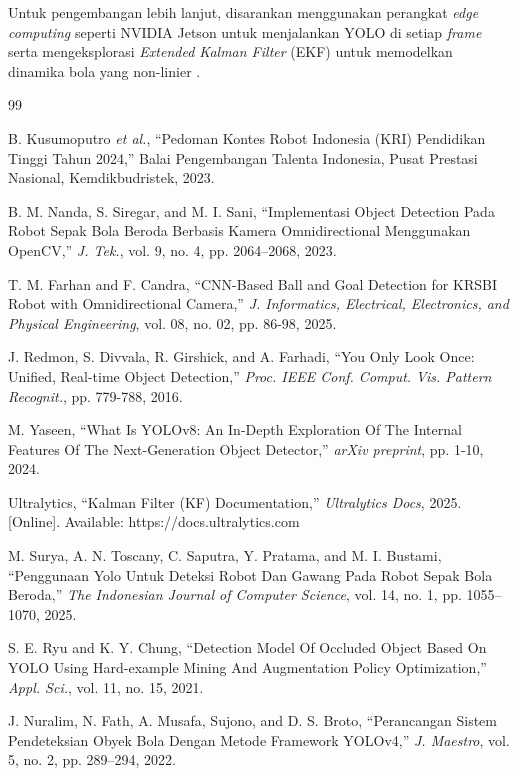 \documentclass[12pt,a4paper]{article}
\begin{document}
Untuk pengembangan lebih lanjut, disarankan menggunakan perangkat \textit{edge computing} seperti NVIDIA Jetson untuk menjalankan YOLO di setiap \textit{frame} serta mengeksplorasi \textit{Extended Kalman Filter} (EKF) untuk memodelkan dinamika bola yang non-linier \cite{Firdaus2025}.

\begin{thebibliography}{99}

 B. Kusumoputro \textit{et al.}, ``Pedoman Kontes Robot Indonesia (KRI) Pendidikan Tinggi Tahun 2024,'' Balai Pengembangan Talenta Indonesia, Pusat Prestasi Nasional, Kemdikbudristek, 2023.

 B. M. Nanda, S. Siregar, and M. I. Sani, ``Implementasi Object Detection Pada Robot Sepak Bola Beroda Berbasis Kamera Omnidirectional Menggunakan OpenCV,'' \textit{J. Tek.}, vol. 9, no. 4, pp. 2064–2068, 2023.

 T. M. Farhan and F. Candra, ``CNN-Based Ball and Goal Detection for KRSBI Robot with Omnidirectional Camera,'' \textit{J. Informatics, Electrical, Electronics, and Physical Engineering}, vol. 08, no. 02, pp. 86-98, 2025.

 J. Redmon, S. Divvala, R. Girshick, and A. Farhadi, ``You Only Look Once: Unified, Real-time Object Detection,'' \textit{Proc. IEEE Conf. Comput. Vis. Pattern Recognit.}, pp. 779-788, 2016.

 M. Yaseen, ``What Is YOLOv8: An In-Depth Exploration Of The Internal Features Of The Next-Generation Object Detector,'' \textit{arXiv preprint}, pp. 1-10, 2024.

 Ultralytics, ``Kalman Filter (KF) Documentation,'' \textit{Ultralytics Docs}, 2025. [Online]. Available: https://docs.ultralytics.com

 M. Surya, A. N. Toscany, C. Saputra, Y. Pratama, and M. I. Bustami, ``Penggunaan Yolo Untuk Deteksi Robot Dan Gawang Pada Robot Sepak Bola Beroda,'' \textit{The Indonesian Journal of Computer Science}, vol. 14, no. 1, pp. 1055–1070, 2025.

 S. E. Ryu and K. Y. Chung, ``Detection Model Of Occluded Object Based On YOLO Using Hard-example Mining And Augmentation Policy Optimization,'' \textit{Appl. Sci.}, vol. 11, no. 15, 2021.

 J. Nuralim, N. Fath, A. Musafa, Sujono, and D. S. Broto, ``Perancangan Sistem Pendeteksian Obyek Bola Dengan Metode Framework YOLOv4,'' \textit{J. Maestro}, vol. 5, no. 2, pp. 289–294, 2022.


\end{thebibliography}
\end{document}
